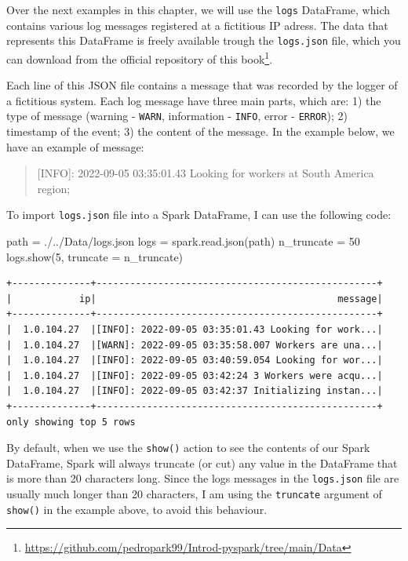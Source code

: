 \documentclass[
  11pt,
  letterpaper,
  DIV=11,
  numbers=noendperiod]{scrreprt}
\newenvironment{Shaded}{\begin{snugshade}}{\end{snugshade}}
\newcommand{\DecValTok}[1]{\textcolor[rgb]{0.68,0.00,0.00}{#1}}
\newcommand{\NormalTok}[1]{\textcolor[rgb]{0.00,0.23,0.31}{#1}}
\newcommand{\OperatorTok}[1]{\textcolor[rgb]{0.37,0.37,0.37}{#1}}
\newcommand{\StringTok}[1]{\textcolor[rgb]{0.13,0.47,0.30}{#1}}
\begin{document}
Over the next examples in this chapter, we will use the \texttt{logs}
DataFrame, which contains various log messages registered at a
fictitious IP adress. The data that represents this DataFrame is freely
available trough the \texttt{logs.json} file, which you can download
from the official repository of this book\footnote{\url{https://github.com/pedropark99/Introd-pyspark/tree/main/Data}}.

Each line of this JSON file contains a message that was recorded by the
logger of a fictitious system. Each log message have three main parts,
which are: 1) the type of message (warning - \texttt{WARN}, information
- \texttt{INFO}, error - \texttt{ERROR}); 2) timestamp of the event; 3)
the content of the message. In the example below, we have an example of
message:

\begin{quote}
{[}INFO{]}: 2022-09-05 03:35:01.43 Looking for workers at South America
region;
\end{quote}

To import \texttt{logs.json} file into a Spark DataFrame, I can use the
following code:

\begin{Shaded}
\begin{Highlighting}[]
\NormalTok{path }\OperatorTok{=} \StringTok{\textquotesingle{}./../Data/logs.json\textquotesingle{}}
\NormalTok{logs }\OperatorTok{=}\NormalTok{ spark.read.json(path)}
\NormalTok{n\_truncate }\OperatorTok{=} \DecValTok{50}
\NormalTok{logs.show(}\DecValTok{5}\NormalTok{, truncate }\OperatorTok{=}\NormalTok{ n\_truncate)}
\end{Highlighting}
\end{Shaded}

\begin{verbatim}
+--------------+--------------------------------------------------+
|            ip|                                           message|
+--------------+--------------------------------------------------+
|  1.0.104.27  |[INFO]: 2022-09-05 03:35:01.43 Looking for work...|
|  1.0.104.27  |[WARN]: 2022-09-05 03:35:58.007 Workers are una...|
|  1.0.104.27  |[INFO]: 2022-09-05 03:40:59.054 Looking for wor...|
|  1.0.104.27  |[INFO]: 2022-09-05 03:42:24 3 Workers were acqu...|
|  1.0.104.27  |[INFO]: 2022-09-05 03:42:37 Initializing instan...|
+--------------+--------------------------------------------------+
only showing top 5 rows
\end{verbatim}

By default, when we use the \texttt{show()} action to see the contents
of our Spark DataFrame, Spark will always truncate (or cut) any value in
the DataFrame that is more than 20 characters long. Since the logs
messages in the \texttt{logs.json} file are usually much longer than 20
characters, I am using the \texttt{truncate} argument of \texttt{show()}
in the example above, to avoid this behaviour.
\end{document}
